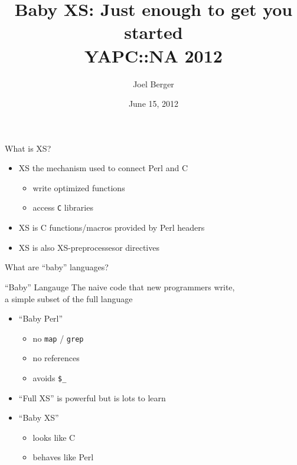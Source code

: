 \documentclass{beamer}
\title[Baby XS]{Baby XS: Just enough to get you started\\YAPC::NA 2012}
\author{Joel Berger}
\institute[UIC]{University of Illinois at Chicago}
\date{June 15, 2012}
\providecommand{\code}[1]{{\texttt{\scriptsize{#1}}}}
\begin{document}
\begin{frame}
  \maketitle
\end{frame}

\begin{frame}{What is XS?}
  \begin{itemize}
    \item XS the mechanism used to connect Perl and C
      \begin{itemize}
        \item write optimized functions
        \item access \code{C} libraries
      \end{itemize}
  \end{itemize}
  \vfill
  \vfill
  \begin{itemize}
    \item XS is C functions/macros provided by Perl headers
    \item XS is also XS-preprocessesor directives
  \end{itemize}
\end{frame}

\begin{frame}{What are ``baby'' languages?}
  \begin{block}{``Baby'' Langauge}
    The naive code that new programmers write,\\a simple subset of the full language
  \end{block}
  \begin{itemize}
    \item ``Baby Perl''
      \begin{itemize}
        \item no \code{map} / \code{grep}
        \item no references
        \item avoids \code{\$\_}
      \end{itemize}
    \item ``Full XS'' is powerful but is lots to learn
    \item ``Baby XS'' 
     \begin{itemize}
       \item looks like C
       \item behaves like Perl
     \end{itemize}
  \end{itemize}
\end{frame}
\end{document}
